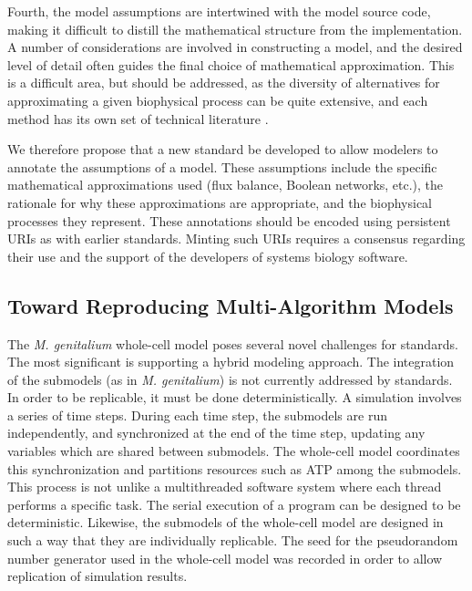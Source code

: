 \documentclass[journal,transmag,twoside]{IEEEtran}
\newcommand{\karrcomment}[2]{\pdfmarkupcomment[markup=Highlight,color=yellow,author={Jonathan Karr}]{#1}{#2}}
\begin{document}

Fourth, the model assumptions are intertwined with the model source code, making it difficult
to distill the mathematical structure from the implementation.
A number of considerations are involved in constructing a model, and the desired level of detail
often guides the final choice of mathematical approximation.
This is a difficult area, but should be addressed, as the diversity of alternatives for approximating
a given biophysical process can be quite extensive, and each method has its own set of
technical literature \cite{gunawardena2014models}.

We therefore propose that a new standard be developed to allow modelers to annotate the assumptions
of a model.
These assumptions include the specific mathematical approximations used (flux balance, Boolean networks, etc.),
the rationale for why these approximations are appropriate, and the biophysical processes they represent.
These annotations should be encoded using persistent URIs as with earlier standards.
Minting such URIs requires a consensus regarding their use and the support of the developers of
systems biology software.

\subsection{Toward Reproducing Multi-Algorithm Models}

The \textit{M. genitalium} whole-cell model poses several novel challenges for standards.
The most significant is supporting a hybrid modeling approach.
The integration of the submodels (as in \textit{M. genitalium}) is not currently
addressed by standards. In order to be replicable, it must be done deterministically.
A simulation involves a series of time steps. During each time step, the
submodels are run independently,
and synchronized at the end of the time step, updating any variables
which are shared between submodels.
The whole-cell model coordinates this synchronization and partitions resources such as ATP
among the submodels.
This process is not unlike a multithreaded software system where each thread performs
a specific task. The serial execution of a program can be designed to be deterministic.
Likewise, the submodels of the whole-cell model are designed in such a way that
they are individually replicable. The seed for the pseudorandom number generator
used in the whole-cell model was recorded in order to allow replication of simulation results.
\end{document}
